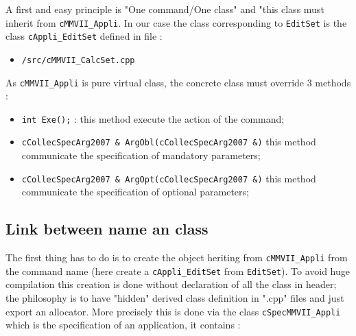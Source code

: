A first and easy principle is "One command/One class" and  "this class must
inherit from {\tt cMMVII\_Appli}.
In our case the class corresponding to {\tt EditSet} is the class {\tt cAppli\_EditSet}
defined in file :

\begin{itemize}
   \item  {\tt \MMVIDIR/src/cMMVII\_CalcSet.cpp}
\end{itemize}
As {\tt cMMVII\_Appli} is pure virtual class, the concrete class must override
$3$ methods :

\begin{itemize}
   \item {\tt int Exe();} : this method execute the action of the command;

   \item {\tt cCollecSpecArg2007 \& ArgObl(cCollecSpecArg2007 \&)} this method communicate the specification
         of mandatory parameters;

   \item {\tt cCollecSpecArg2007 \& ArgOpt(cCollecSpecArg2007 \&)} this method communicate the specification
         of optional parameters;
\end{itemize}



\subsection{Link between name an class}

The first thing \PPP has to do is to create the object heriting
from {\tt cMMVII\_Appli} from the command name (here create a {\tt cAppli\_EditSet}
from  {\tt EditSet}). To avoid huge compilation this creation is done
without declaration of all the class in header; the philosophy is to have
"hidden"  derived class definition in ".cpp" files  and just export an allocator.
More precisely this is done via the class {\tt cSpecMMVII\_Appli} which is
the specification of an application, it contains :

